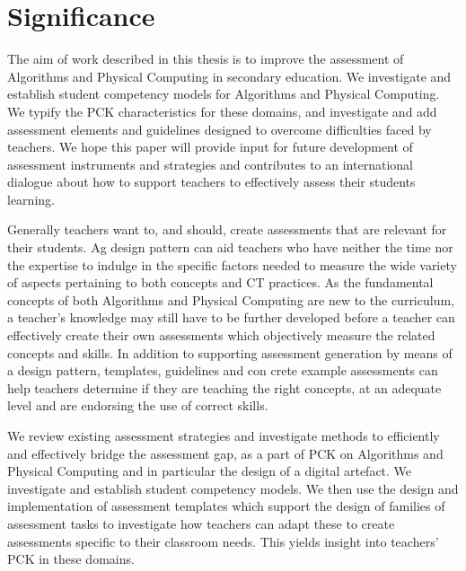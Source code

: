 \section{Significance}\label{sec:significance}


The aim of work described in this thesis is to improve the assessment of Algorithms and Physical Computing in secondary education.
We investigate and establish student competency models for Algorithms and Physical Computing. We typify the PCK characteristics for these domains, and investigate and add assessment elements and guidelines designed to overcome difficulties faced by teachers. We hope this paper will provide input for future development of assessment instruments and strategies and contributes to an international dialogue about how to support teachers to effectively assess their students learning.

Generally teachers want to, and should, create assessments that are relevant for their students. Ag design pattern can aid teachers who have neither the time nor the expertise to indulge in the specific factors needed to measure the wide variety of aspects pertaining to both concepts and CT practices. As the fundamental concepts of both Algorithms and Physical Computing are new to the curriculum, a teacher's knowledge may still have to be further developed before a teacher can effectively create their own assessments which objectively measure the related concepts and skills. In addition to supporting assessment generation by means of a design pattern, templates, guidelines and con crete example assessments can help teachers determine if they are teaching the right concepts, at an adequate level and are endorsing the use of correct skills.

We review existing assessment strategies and investigate methods to efficiently and effectively bridge the assessment gap, as a part of PCK on Algorithms and Physical Computing and in particular the design of a digital artefact. We investigate and establish student competency models. We then use the design and implementation of assessment templates which support the design of families of assessment tasks to investigate how teachers can adapt these to create assessments specific to their classroom needs. This yields insight into teachers' PCK in these domains.







